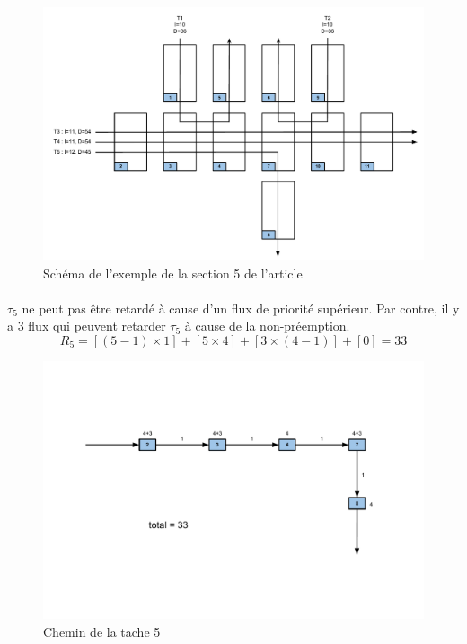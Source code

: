 \documentclass[10pt,a4paper]{article}
\newenvironment{figureH} {%
\begin{figure}[H]
}{%
\end{figure}
}
\begin{document}
\begin{figureH}
  \includegraphics[width=\textwidth]{images/global.pdf}
  \center
  \caption{Schéma de l'exemple de la section 5 de l'article}
  \label{image_global}
\end{figureH}

\paragraph{}
$\tau_5$ ne peut pas être retardé à cause d'un flux de priorité supérieur. Par contre, il y a 3 flux qui peuvent retarder $\tau_5$ à cause de la non-préemption.
\[ R_{5} = [(5-1) \times 1]  + [5 \times 4] + [3 \times (4-1)] + [0] = 33 \]

\begin{figureH}
  \includegraphics[width=\textwidth]{images/tache5.pdf}
  \center
  \caption{Chemin de la tache 5}
  \label{image_global}
\end{figureH}
\end{document}
